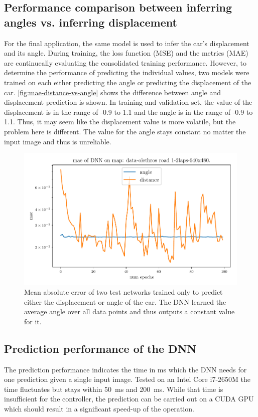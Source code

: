 \documentclass[10pt,a4paper,twoside,journal]{IEEEtran}
\begin{document}
\subsection{Performance comparison between inferring angles vs. inferring displacement}
For the final application, the same model is used to infer the car's displacement and its angle. During training, the loss function (MSE) and the metrics (MAE) are continueally evaluating the consolidated training performance. However, to determine the performance of predicting the individual values, two models were trained on each either predicting the angle or predicting the displacement of the car. \autoref{fig:mae-distance-vs-angle} shows the difference between angle and displacement prediction is shown. In training and validation set, the value of the displacement is in the range of -0.9 to 1.1 and the angle is in the range of -0.9 to 1.1. Thus, it may seem like the displacement value is more volatile, but the problem here is different. The value for the angle stays constant no matter the input image and thus is unreliable. 

\begin{figure}[ht]
	\centering
	\includegraphics[width=\columnwidth]{attachments/alexnet-val_mae-angle_dist_comp-05425-86589.pdf}
	\caption{Mean absolute error of two test networks trained only to predict either the displacement or angle of the car. The DNN learned the average angle over all data points and thus outputs a constant value for it.}
	\label{fig:mae-distance-vs-angle}
\end{figure}

\subsection{Prediction performance of the DNN}
The prediction performance indicates the time in ms which the DNN needs for one prediction given a single input image. Tested on an Intel Core i7-2650M the time fluctuates but stays within \SI{50}{\milli\second} and \SI{200}{\milli\second}. While that time is insufficient for the controller, the prediction can be carried out on a CUDA GPU which should result in a significant speed-up of the operation.
\end{document}
